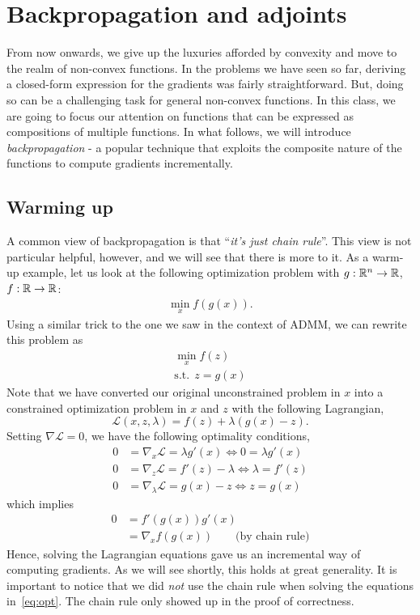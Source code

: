 \section{Backpropagation and adjoints}
 From now onwards, we give up the luxuries afforded by convexity and move to the realm of non-convex functions. In the problems we have seen so far, deriving a closed-form expression for the gradients was fairly straightforward. But, doing so can be a challenging task for general non-convex functions. In this class, we are going to focus our attention on functions that can be expressed as compositions of multiple functions. In what follows, we will introduce \textit{backpropagation} - a popular technique that exploits the composite nature of the functions to compute gradients incrementally. 

\subsection{Warming up}
A common view of backpropagation is that ``\textit{it's just chain rule}''. 
This view is not particular helpful, however, and we will see that there is more
to it. As a warm-up example, let us look at the following optimization problem
with $g: \mathbb{R}^n \rightarrow \mathbb{R}$, $f: \mathbb{R} \rightarrow \mathbb{R}$:
\begin{align}
\min_{x} f(g(x)).
\end{align}
Using a similar trick to the one we saw in the context of ADMM, we can rewrite this problem as
\begin{align}
\min_{x} f(z) \\
\text{s.t.} \ \ z = g(x) \nonumber 
\end{align}
Note that we have converted our original unconstrained problem in $x$ into a constrained optimization problem in $x$ and $z$ with the following Lagrangian,
\begin{equation}
\mathcal{L} (x, z, \lambda) = f(z) + \lambda(g(x) - z).
\end{equation}
Setting $\nabla \mathcal{L} = 0$,  we have the following optimality conditions,
\begin{subequations}
\label{eq:opt}
\begin{align}
0 &= \nabla_x \mathcal{L} = \lambda g'(x) \Leftrightarrow 0 = \lambda g'(x) \label{eq:optx} \\
0 &= \nabla_z \mathcal{L} = f'(z) - \lambda \Leftrightarrow \lambda = f'(z) \label{eq:optz} \\
0 &= \nabla_{\lambda} \mathcal{L} = g(x) - z \Leftrightarrow z = g(x) \label{eq:optlambda}
\end{align}
\end{subequations}
which implies 
\begin{align}
0 &= f'(g(x))g'(x) \nonumber \\
&= \nabla_x f(g(x)) \nonumber \qquad \text{(by chain rule)} 
\end{align}
Hence, solving the Lagrangian equations gave us an incremental way of computing
gradients. As we will see shortly, this holds at great generality. It is
important to notice that we did \textit{not} use the chain rule when solving the
equations in~\eqref{eq:opt}. The chain rule only showed up in the proof of
correctness.

